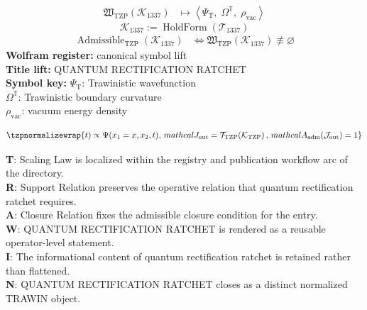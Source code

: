 \noindent
\begin{minipage}[t]{0.48\linewidth}
\begingroup
\small
\[
\begin{aligned}
\mathfrak{W}_{\mathrm{TZP}}\!\left(\mathcal{K}_{1337}\right)
&\longmapsto
\left\langle \Psi_{\mathrm{T}},\; \Omega^{\mathbb{T}},\; \rho_{\mathrm{vac}} \right\rangle
\end{aligned}
\]
\[
\mathcal{K}_{1337}
:=
\operatorname{HoldForm}\!\left(\mathcal{T}_{1337}\right)
\]
\[
\begin{aligned}
\operatorname{Admissible}_{\mathrm{TZP}}\!\left(\mathcal{K}_{1337}\right)
&\Longleftrightarrow
\mathfrak{W}_{\mathrm{TZP}}\!\left(\mathcal{K}_{1337}\right)\not\equiv\varnothing
\end{aligned}
\]
\textbf{Wolfram register:} canonical symbol lift\\
\textbf{Title lift:} QUANTUM RECTIFICATION RATCHET\\
\textbf{Symbol key:} \(\Psi_{\mathrm{T}}\): Trawinistic wavefunction\\ \(\Omega^{\mathbb{T}}\): Trawinistic boundary curvature\\ \(\rho_{\mathrm{vac}}\): vacuum energy density
\par
\endgroup
\end{minipage}\hfill
\begin{minipage}[t]{0.48\linewidth}
\[
\tzpnormalizewrap{t) \propto \Psi(x_1=x,x_2,t),\,mathcal{J}_{\mathrm{out}} = \mathcal{T}_{\mathrm{TZP}}\!\left(\mathcal{K}_{\mathrm{TZP}}\right),\,mathcal{A}_{\mathrm{adm}}\!\left(\mathcal{J}_{\mathrm{out}}\right)=1}
\]

\small
\textbf{T}: Scaling Law is localized within the registry and publication workflow arc of the directory.\\
\textbf{R}: Support Relation preserves the operative relation that quantum rectification ratchet requires.\\
\textbf{A}: Closure Relation fixes the admissible closure condition for the entry.\\
\textbf{W}: QUANTUM RECTIFICATION RATCHET is rendered as a reusable operator-level statement.\\
\textbf{I}: The informational content of quantum rectification ratchet is retained rather than flattened.\\
\textbf{N}: QUANTUM RECTIFICATION RATCHET closes as a distinct normalized TRAWIN object.
\normalsize
\end{minipage}

